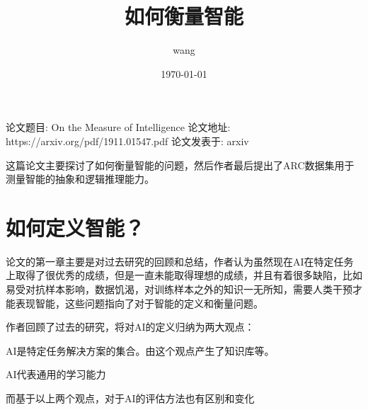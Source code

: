\documentclass{article}
\title{如何衡量智能}
\author{wang}
\date{\today}
\begin{document}
\maketitle

论文题目: On the Measure of Intelligence
论文地址: https://arxiv.org/pdf/1911.01547.pdf
论文发表于: arxiv

这篇论文主要探讨了如何衡量智能的问题，然后作者最后提出了ARC数据集用于测量智能的抽象和逻辑推理能力。

\section{如何定义智能？}
论文的第一章主要是对过去研究的回顾和总结，作者认为虽然现在AI在特定任务上取得了很优秀的成绩，但是一直未能取得理想的成绩，并且有着很多缺陷，比如易受对抗样本影响，数据饥渴，对训练样本之外的知识一无所知，需要人类干预才能表现智能，这些问题指向了对于智能的定义和衡量问题。

作者回顾了过去的研究，将对AI的定义归纳为两大观点：

\item AI是特定任务解决方案的集合。由这个观点产生了知识库等。

\item AI代表通用的学习能力

而基于以上两个观点，对于AI的评估方法也有区别和变化
\end{document}
